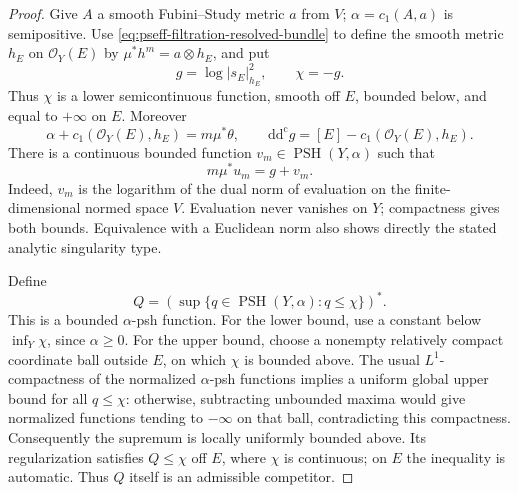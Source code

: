 \begin{proof}
Give \(A\) a smooth Fubini--Study metric \(a\) from \(V\);
\(\alpha=c_1(A,a)\) is semipositive.
Use \eqref{eq:pseff-filtration-resolved-bundle} to define the smooth metric \(h_E\) on
\(\mathcal O_Y(E)\) by \(\mu^*h^m=a\otimes h_E\), and put
\[
 g=\log|s_E|_{h_E}^2,\qquad \chi=-g.
\]
Thus \(\chi\) is a lower semicontinuous function, smooth off \(E\),
bounded below, and equal to \(+\infty\) on \(E\).
Moreover
\[
 \alpha+c_1(\mathcal O_Y(E),h_E)=m\mu^*\theta,\qquad
 \mathrm d\mathrm d^{\mathrm c}g=[E]-c_1(\mathcal O_Y(E),h_E).
\]
There is a continuous bounded function \(v_m\in\operatorname{PSH}(Y,\alpha)\)
such that
\[
\tag{71.48e}\label{eq:pseff-filtration-fixed-singularity}
                       m\mu^*u_m=g+v_m.
\]
Indeed, \(v_m\) is the logarithm of the dual norm of evaluation on the
finite-dimensional normed space \(V\).  Evaluation never vanishes on
\(Y\); compactness gives both bounds.  Equivalence with a Euclidean norm
also shows directly the stated analytic singularity type.

Define
\[
\tag{71.48f}\label{eq:pseff-filtration-residual-envelope}
 Q=\left(\sup\{q\in\operatorname{PSH}(Y,\alpha):q\leq\chi\}\right)^*.
\]
This is a bounded \(\alpha\)-psh function.  For the lower bound, use a
constant below \(\inf_Y\chi\), since \(\alpha\geq0\).
For the upper bound, choose a nonempty relatively compact coordinate ball
outside \(E\), on which \(\chi\) is bounded above.
The usual \(L^1\)-compactness of the normalized \(\alpha\)-psh functions
implies a uniform global upper bound for all \(q\leq\chi\): otherwise,
subtracting unbounded maxima would give normalized functions tending to
\(-\infty\) on that ball, contradicting this compactness.
Consequently the supremum is locally uniformly bounded above.
Its regularization satisfies \(Q\leq\chi\) off \(E\), where \(\chi\) is
continuous; on \(E\) the inequality is automatic.  Thus \(Q\) itself is
an admissible competitor.


\end{proof}

